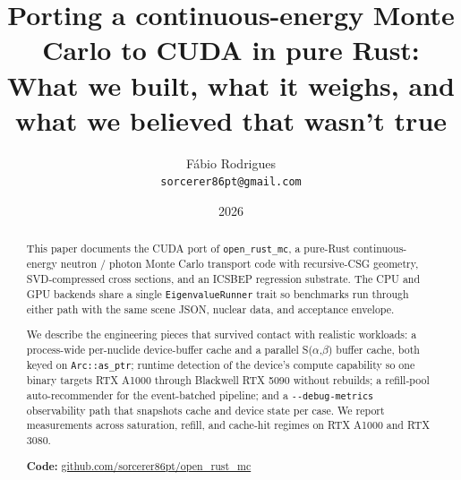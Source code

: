 \title{Porting a continuous-energy Monte Carlo to CUDA in pure Rust:\\[0.3em]
\normalsize What we built, what it weighs, and what we
believed that wasn't true}
\author{F\'abio Rodrigues\\\small \texttt{sorcerer86pt@gmail.com}}
\date{2026}

\maketitle

\begin{abstract}
This paper documents the CUDA port of \texttt{open\_rust\_mc},
a pure-Rust continuous-energy neutron / photon Monte Carlo
transport code with recursive-CSG geometry, SVD-compressed
cross sections, and an ICSBEP regression substrate. The CPU
and GPU backends share a single \texttt{EigenvalueRunner}
trait so benchmarks run through either path with the same
scene JSON, nuclear data, and acceptance envelope.

We describe the engineering pieces that survived contact with
realistic workloads: a process-wide per-nuclide device-buffer
cache and a parallel S($\alpha$,$\beta$) buffer cache, both
keyed on \texttt{Arc::as\_ptr}; runtime detection of the
device's compute capability so one binary targets RTX A1000
through Blackwell RTX 5090 without rebuilds; a refill-pool
auto-recommender for the event-batched pipeline; and a
\texttt{-{}-debug-metrics} observability path that snapshots
cache and device state per case. We report measurements
across saturation, refill, and cache-hit regimes on RTX A1000
and RTX 3080.

\textbf{Code:}
\href{https://github.com/sorcerer86pt/open_rust_mc}%
{github.com/sorcerer86pt/open\_rust\_mc}
\end{abstract}
